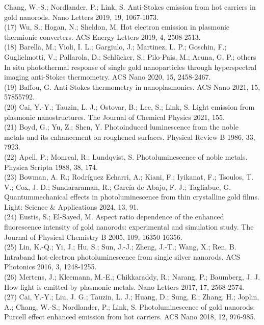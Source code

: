 \documentclass[10pt]{article}
\begin{document}
Chang, W.-S.; Nordlander, P.; Link, S. Anti-Stokes emission from hot carriers in gold nanorods. Nano Letters 2019, 19, 1067-1073.\\
(17) Wu, S.; Hogan, N.; Sheldon, M. Hot electron emission in plasmonic thermionic converters. ACS Energy Letters 2019, 4, 2508-2513.\\
(18) Barella, M.; Violi, I. L.; Gargiulo, J.; Martinez, L. P.; Goschin, F.; Guglielmotti, V.; Pallarola, D.; Schlücker, S.; Pilo-Pais, M.; Acuna, G. P.; others In situ photothermal response of single gold nanoparticles through hyperspectral imaging anti-Stokes thermometry. ACS Nano 2020, 15, 2458-2467.\\
(19) Baffou, G. Anti-Stokes thermometry in nanoplasmonics. ACS Nano 2021, 15, 57855792.\\
(20) Cai, Y.-Y.; Tauzin, L. J.; Ostovar, B.; Lee, S.; Link, S. Light emission from plasmonic nanostructures. The Journal of Chemical Physics 2021, 155.\\
(21) Boyd, G.; Yu, Z.; Shen, Y. Photoinduced luminescence from the noble metals and its enhancement on roughened surfaces. Physical Review B 1986, 33, 7923.\\
(22) Apell, P.; Monreal, R.; Lundqvist, S. Photoluminescence of noble metals. Physica Scripta 1988, 38, 174.\\
(23) Bowman, A. R.; Rodríguez Echarri, A.; Kiani, F.; Iyikanat, F.; Tsoulos, T. V.; Cox, J. D.; Sundararaman, R.; García de Abajo, F. J.; Tagliabue, G. Quantummechanical effects in photoluminescence from thin crystalline gold films. Light: Science \& Applications 2024, 13, 91.\\
(24) Eustis, S.; El-Sayed, M. Aspect ratio dependence of the enhanced fluorescence intensity of gold nanorods: experimental and simulation study. The Journal of Physical Chemistry B 2005, 109, 16350-16356.\\
(25) Lin, K.-Q.; Yi, J.; Hu, S.; Sun, J.-J.; Zheng, J.-T.; Wang, X.; Ren, B. Intraband hot-electron photoluminescence from single silver nanorods. ACS Photonics 2016, 3, 1248-1255.\\
(26) Mertens, J.; Kleemann, M.-E.; Chikkaraddy, R.; Narang, P.; Baumberg, J. J. How light is emitted by plasmonic metals. Nano Letters 2017, 17, 2568-2574.\\
(27) Cai, Y.-Y.; Liu, J. G.; Tauzin, L. J.; Huang, D.; Sung, E.; Zhang, H.; Joplin, A.; Chang, W.-S.; Nordlander, P.; Link, S. Photoluminescence of gold nanorods: Purcell effect enhanced emission from hot carriers. ACS Nano 2018, 12, 976-985.\\
\end{document}
